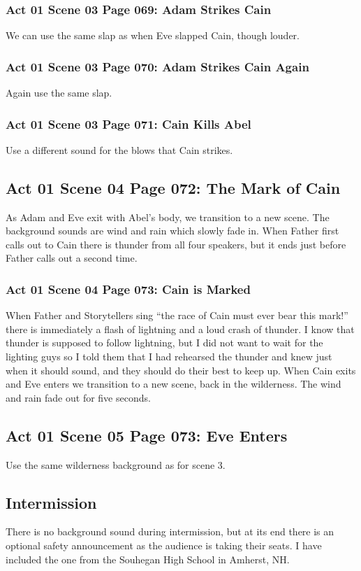 \documentclass[letterpaper,twoside]{article}
\begin{document}
\subsubsection{Act 01 Scene 03 Page 069: Adam Strikes Cain}
We can use the same slap as when Eve slapped Cain, though louder.
\subsubsection{Act 01 Scene 03 Page 070: Adam Strikes Cain Again}
Again use the same slap.
\subsubsection{Act 01 Scene 03 Page 071: Cain Kills Abel}
Use a different sound for the blows that Cain strikes.
\subsection{Act 01 Scene 04 Page 072: The Mark of Cain}
As Adam and Eve exit with Abel's body, we transition to a new
scene.  The background sounds are wind and rain which slowly
fade in.
When Father first calls out to Cain there is thunder from
all four speakers, but it ends just before Father calls out
a second time.
\subsubsection{Act 01 Scene 04 Page 073: Cain is Marked}
When Father and Storytellers sing
``the race of Cain must ever bear this mark!''
there is immediately a flash of lightning and a loud crash of thunder.
I know that thunder is supposed to follow lightning, but I did not
want to wait for the lighting guys so I told them that I had rehearsed
the thunder and knew just when it should sound, and they should do
their best to keep up.
When Cain exits and Eve enters we transition to a new scene,
back in the wilderness.  The wind and rain fade out for five seconds.
\subsection{Act 01 Scene 05 Page 073: Eve Enters}
Use the same wilderness background as for scene 3.
\subsection{Intermission}
There is no background sound during intermission, but at its end
there is an optional safety announcement
as the audience is taking their seats.  I have included the one
from the Souhegan High School in Amherst, NH.
\end{document}
